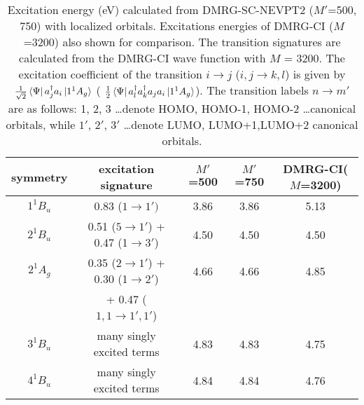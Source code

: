 \begin{table*}
  \centering
  \caption{Excitation energy (eV) calculated from DMRG-SC-NEVPT2 ($M'$=500, 750) with localized orbitals.
    Excitations energies of DMRG-CI ($M$=3200) also shown for comparison. The transition signatures are calculated from the
    DMRG-CI wave function with $M$ = 3200. The excitation coefficient of the transition $i\rightarrow j$ ($i,j \rightarrow k,l$) is given by $\frac{1}{\sqrt{2}}\bra{\Psi}a^\dagger_j a_i\ket{1^1A_g}$ ( $\frac{1}{2}\bra{\Psi}a^\dagger_l a^\dagger_k a_j a_i\ket{1^1A_g}$).
The transition labels $n\rightarrow m'$ are as follows: 1, 2, 3 \ldots denote HOMO, HOMO-1, HOMO-2 \ldots canonical orbitals, while $1'$, $2'$, $3'$ \ldots denote LUMO, LUMO+1,LUMO+2 canonical orbitals. }
  \label{table:local}
  \begin{tabular}{ccccc}
    \hline
\hline
symmetry & excitation signature &  $M'$=500 & $M'$=750 & DMRG-CI($M$=3200) \\

\hline
  $1^1B_u$ & 0.83 ($1\rightarrow1')$ & 3.86   &   3.86   & 5.13 \\
  $2^1B_u$ & 0.51 ($5\rightarrow 1'$) + 0.47 (1$\rightarrow 3'$) & 4.50   &   4.50   & 4.50    \\
  $2^1A_g$ & 0.35 ($2\rightarrow 1'$) + 0.30 (1$\rightarrow 2'$) & 4.66   &   4.66   & 4.85    \\
  &   + 0.47 ($1,1\rightarrow1',1'$)  & & &\\
  $3^1B_u$ & many singly excited terms & 4.83   &   4.83   & 4.75    \\
  $4^1B_u$ & many singly excited terms & 4.84   &   4.84   & 4.76    \\
\hline
\hline
\end{tabular}
\end{table*}
